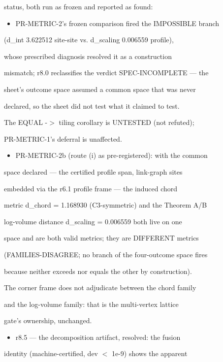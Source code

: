 \documentclass[11pt,a4paper]{article}
\theoremstyle{definition}
\begin{document}
status, both run as frozen and reported as found:


\begin{itemize}[leftmargin=1.4em]
\item PR-METRIC-2's frozen comparison fired the IMPOSSIBLE branch
\end{itemize}
    (d\_int 3.622512 site-site vs. d\_scaling 0.006559 profile),

    whose prescribed diagnosis resolved it as a construction

    mismatch; r8.0 reclassifies the verdict SPEC-INCOMPLETE — the

    sheet's outcome space assumed a common space that was never

    declared, so the sheet did not test what it claimed to test.

    The EQUAL -$>$ tiling corollary is UNTESTED (not refuted);

    PR-METRIC-1's deferral is unaffected.

\begin{itemize}[leftmargin=1.4em]
\item PR-METRIC-2b (route (i) as pre-registered): with the common
\end{itemize}
    space declared — the certified profile span, link-graph sites

    embedded via the r6.1 profile frame — the induced chord

    metric d\_chord = 1.168930 (C3-symmetric) and the Theorem A/B

    log-volume distance d\_scaling = 0.006559 both live on one

    space and are both valid metrics; they are DIFFERENT metrics

    (FAMILIES-DISAGREE; no branch of the four-outcome space fires

    because neither exceeds nor equals the other by construction).

    The corner frame does not adjudicate between the chord family

    and the log-volume family: that is the multi-vertex lattice

    gate's ownership, unchanged.

\begin{itemize}[leftmargin=1.4em]
\item r8.5 --- the decomposition artifact, resolved: the fusion
\end{itemize}
    identity (machine-certified, dev $<$ 1e-9) shows the apparent
\end{document}
